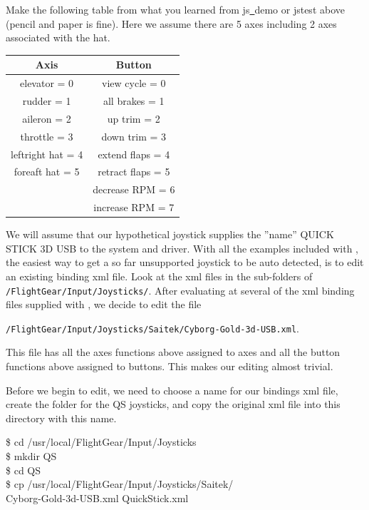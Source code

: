  Make the following table from what you learned from js\underline{~}demo or jstest above (pencil and paper is fine).  Here we assume there are 5 axes including 2 axes associated with the hat.
\medskip

\begin{tabular}{c|c}
		Axis			      &           Button\\\hline
	elevator 	= 0	     &     	view cycle 	= 0\\
	rudder 		= 1	     &     	all brakes 	= 1\\
	aileron 	= 2	     &      	up trim 	= 2\\
	throttle 	= 3		   &       down trim 	= 3\\
	leftright hat 	= 4&	    	extend flaps	= 4\\
	foreaft hat 	= 5	&	      retract flaps	= 5\\
					          &        decrease RPM	= 6\\
					          &        increase RPM	= 7
\end{tabular}
\medskip


We will assume that our hypothetical joystick supplies the ''name'' QUICK STICK 3D USB to the system and driver. With all the examples included with \FlightGear{}, the easiest way to get a so far unsupported joystick to be auto detected, is to edit an existing binding xml file.  Look at the xml files in the sub-folders of \texttt{/FlightGear/Input/Joysticks/}. After evaluating at several of the xml binding files supplied with \FlightGear{}, we decide to edit the file

\noindent
 \texttt{/FlightGear/Input/Joysticks/Saitek/Cyborg-Gold-3d-USB.xml}. 
 
 \noindent
  This file has all the axes functions above assigned to axes and all the button functions above assigned to buttons.  This makes our editing almost trivial.

Before we begin to edit, we need to choose a name for our bindings xml file, create the folder for the QS joysticks, and copy the original xml file into this directory with this name.
\medskip


\begin{ttfamily}
\noindent
\$ cd /usr/local/FlightGear/Input/Joysticks\\
\$ mkdir QS\\
\$ cd QS\\
\$ cp  /usr/local/FlightGear/Input/Joysticks/Saitek/\\
Cyborg-Gold-3d-USB.xml  QuickStick.xml
\end{ttfamily}
\medskip

